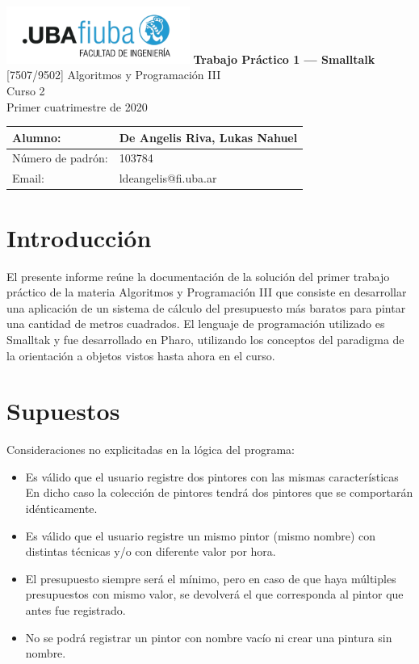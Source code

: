 \documentclass[titlepage,a4paper]{article}
\begin{document}
\begin{titlepage} %
	\hfill\includegraphics[width=6cm]{LogoFiuba3.0HD.png}
    \centering
    \vfill
    \Huge \textbf{Trabajo Práctico 1 — Smalltalk}
    \vskip2cm
    \Large [7507/9502] Algoritmos y Programación III\\
    Curso 2 \\ %
    Primer cuatrimestre de 2020 
    \vfill
    \begin{tabular}{ | l | l | } %
      \hline
      Alumno: & De Angelis Riva, Lukas Nahuel \\ \hline
      Número de padrón: & 103784 \\ \hline
      Email: & ldeangelis@fi.uba.ar \\ \hline
  	\end{tabular}
    \vfill
    \vfill
\end{titlepage}

\tableofcontents %
\newpage

\section{Introducción}\label{sec:intro}
El presente informe reúne la documentación de la solución del primer trabajo práctico de la materia Algoritmos y Programación III que consiste en desarrollar una aplicación de un sistema de cálculo del presupuesto más baratos para pintar una cantidad de metros cuadrados. El lenguaje de programación utilizado es Smalltak y fue desarrollado en Pharo, utilizando los conceptos del paradigma de la orientación a objetos vistos hasta ahora en el curso.

\section{Supuestos}\label{sec:supuestos}

Consideraciones no explicitadas en la lógica del programa:
\begin{itemize}
    \item Es válido que el usuario registre dos pintores con las mismas características\\
    En dicho caso la colección de pintores tendrá dos pintores que se comportarán idénticamente.
    \item Es válido que el usuario registre un mismo pintor (mismo nombre) con distintas técnicas y/o con diferente valor por hora.
    \item El presupuesto siempre será el mínimo, pero en caso de que haya múltiples presupuestos con mismo valor, se devolverá el que corresponda al pintor que antes fue registrado.
    \item No se podrá registrar un pintor con nombre vacío ni crear una pintura sin nombre.
\end{itemize}
\end{document}
